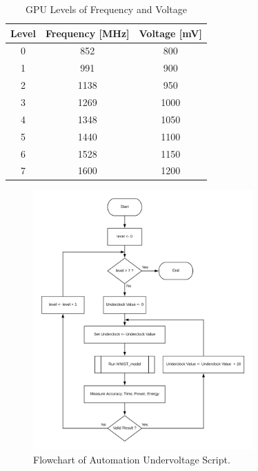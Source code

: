 \begin{table}[!htb]
\renewcommand{\arraystretch}{1.2} %
\centering
\begin{tabular}{ccc}
\textbf{Level} & \textbf{Frequency {[}MHz{]}} & \textbf{Voltage {[}mV{]}} \\ \hline
0              & 852                          & 800                       \\
1              & 991                          & 900                       \\
2              & 1138                         & 950                       \\
3              & 1269                         & 1000                      \\
4              & 1348                         & 1050                      \\
5              & 1440                         & 1100                      \\
6              & 1528                         & 1150                      \\
7              & 1600                         & 1200                      \\ \hline
\end{tabular}
\caption{GPU Levels of Frequency and Voltage}
\label{tab:gpulevels}
\end{table}

\begin{figure}[!htb]
  \centering
  \includegraphics[width=0.75\textwidth]{Figures/Results/Underclock_Program.png}
  \caption[]{Flowchart of Automation Undervoltage Script.}
  \label{fig:undervoltage_program}
\end{figure}






